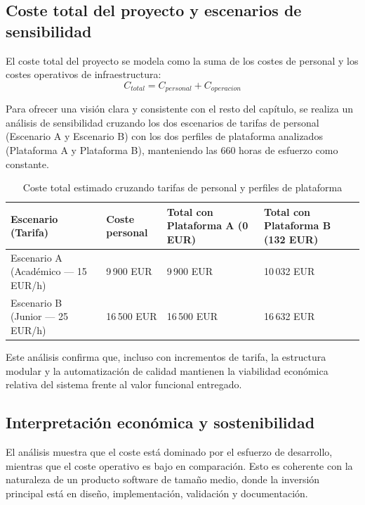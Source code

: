 \subsection{Coste total del proyecto y escenarios de sensibilidad}

El coste total del proyecto se modela como la suma de los costes de personal y los costes operativos de infraestructura:
\[
C_{total} = C_{personal} + C_{operacion}
\]

Para ofrecer una visi\'on clara y consistente con el resto del cap\'itulo, se realiza un an\'alisis de sensibilidad cruzando los dos escenarios de tarifas de personal (Escenario A y Escenario B) con los dos perfiles de plataforma analizados (Plataforma A y Plataforma B), manteniendo las 660 horas de esfuerzo como constante.

\begin{table}[!htbp]
\centering
\begin{tabular}{|P{4.2cm}|P{2.5cm}|P{3.2cm}|P{3.2cm}|}
\hline
\textbf{Escenario (Tarifa)} & \textbf{Coste personal} & \textbf{Total con Plataforma A (0 EUR)} & \textbf{Total con Plataforma B (132 EUR)} \\
\hline
Escenario A (Acad\'emico --- 15 EUR/h) & 9\,900 EUR & 9\,900 EUR & 10\,032 EUR \\
\hline
Escenario B (Junior --- 25 EUR/h) & 16\,500 EUR & 16\,500 EUR & 16\,632 EUR \\
\hline
\end{tabular}
\caption{Coste total estimado cruzando tarifas de personal y perfiles de plataforma}
\label{tab:coste-total-sensibilidad}
\end{table}

Este an\'alisis confirma que,
incluso con incrementos de tarifa,
la estructura modular y la automatizaci\'on de calidad mantienen
la viabilidad econ\'omica relativa del sistema frente al valor funcional entregado.

\subsection{Interpretaci\'on econ\'omica y sostenibilidad}

El an\'alisis muestra que el coste est\'a dominado por el esfuerzo de desarrollo,
mientras que el coste operativo es bajo en comparaci\'on.
Esto es coherente con la naturaleza de un producto software de tama\~no medio,
donde la inversi\'on principal est\'a en dise\~no, implementaci\'on, validaci\'on y documentaci\'on.

